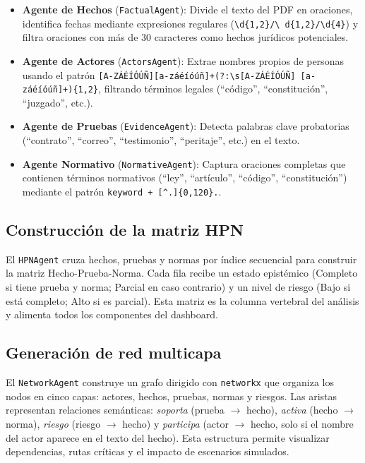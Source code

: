 \documentclass[12pt, letterpaper]{article}
\begin{document}
\begin{itemize}[nosep]
  \item \textbf{Agente de Hechos} (\texttt{FactualAgent}): Divide el
    texto del PDF en oraciones, identifica fechas mediante
    expresiones regulares (\texttt{\textbackslash d\{1,2\}/\textbackslash
    d\{1,2\}/\textbackslash d\{4\}}) y filtra oraciones con más de
    30 caracteres como hechos jurídicos potenciales.
  \item \textbf{Agente de Actores} (\texttt{ActorsAgent}): Extrae
    nombres propios de personas usando el patrón
    \texttt{[A-ZÁÉÍÓÚÑ][a-záéíóúñ]+(?:\textbackslash s[A-ZÁÉÍÓÚÑ]
    [a-záéíóúñ]+)\{1,2\}}, filtrando términos legales (``código'',
    ``constitución'', ``juzgado'', etc.).
  \item \textbf{Agente de Pruebas} (\texttt{EvidenceAgent}): Detecta
    palabras clave probatorias (``contrato'', ``correo'',
    ``testimonio'', ``peritaje'', etc.) en el texto.
  \item \textbf{Agente Normativo} (\texttt{NormativeAgent}): Captura
    oraciones completas que contienen términos normativos (``ley'',
    ``artículo'', ``código'', ``constitución'') mediante el patrón
    \texttt{keyword + [\^{}.]\{0,120\}.}.
\end{itemize}

\subsection{Construcción de la matriz HPN}

El \texttt{HPNAgent} cruza hechos, pruebas y normas por índice
secuencial para construir la matriz Hecho-Prueba-Norma. Cada fila
recibe un estado epistémico (Completo si tiene prueba y norma;
Parcial en caso contrario) y un nivel de riesgo (Bajo si está
completo; Alto si es parcial). Esta matriz es la columna vertebral
del análisis y alimenta todos los componentes del dashboard.

\subsection{Generación de red multicapa}

El \texttt{NetworkAgent} construye un grafo dirigido con
\texttt{networkx} que organiza los nodos en cinco capas: actores,
hechos, pruebas, normas y riesgos. Las aristas representan relaciones
semánticas: \textit{soporta} (prueba \(\rightarrow\) hecho),
\textit{activa} (hecho \(\rightarrow\) norma), \textit{riesgo}
(riesgo \(\rightarrow\) hecho) y \textit{participa} (actor
\(\rightarrow\) hecho, solo si el nombre del actor aparece en el
texto del hecho). Esta estructura permite visualizar dependencias,
rutas críticas y el impacto de escenarios simulados.
\end{document}

